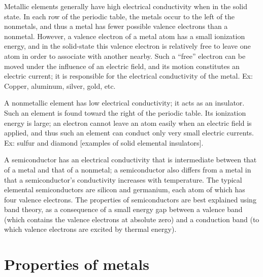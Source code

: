 \documentclass[15pt]{article}
\begin{document}
Metallic elements generally have high electrical conductivity when in the solid state. In each row of the periodic table, the metals occur to the left of the nonmetals, and thus a metal has fewer possible valence electrons than a nonmetal. However, a valence electron of a metal atom has a small ionization energy, and in the solid-state this valence electron is relatively free to leave one atom in order to associate with another nearby. Such a “free” electron can be moved under the influence of an electric field, and its motion constitutes an electric current; it is responsible for the electrical conductivity of the metal. Ex: Copper, aluminum, silver, gold, etc.
\vspace{0.2cm}

A nonmetallic element has low electrical conductivity; it acts as an insulator. Such an element is found toward the right of the periodic table. Its ionization energy is large; an electron cannot leave an atom easily when an electric field is applied, and thus such an element can conduct only very small electric currents. Ex: sulfur and diamond [examples of solid elemental insulators].
\vspace{0.2cm}

A semiconductor has an electrical conductivity that is intermediate between that of a metal and that of a nonmetal; a semiconductor also differs from a metal in that a semiconductor's conductivity increases with temperature. The typical elemental semiconductors are silicon and germanium, each atom of which has four valence electrons. The properties of semiconductors are best explained using band theory, as a consequence of a small energy gap between a valence band (which contains the valence electrons at absolute zero) and a conduction band (to which valence electrons are excited by thermal energy). 

\section*{Properties of metals}
\end{document}
